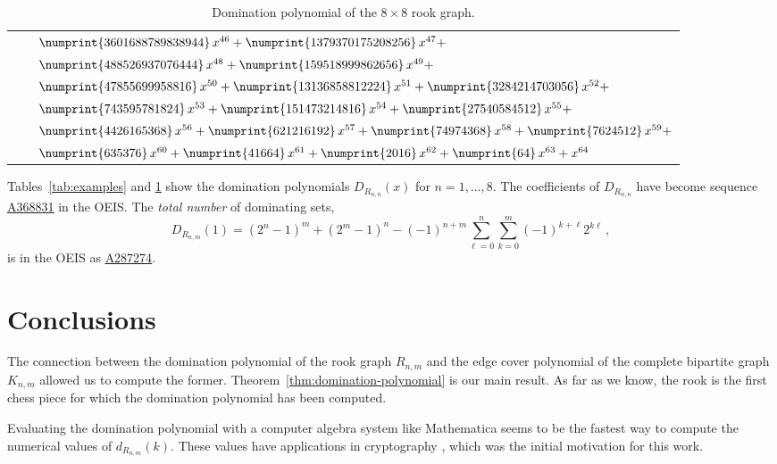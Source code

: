 \documentclass[12pt,reqno]{article}
\newcommand{\seqnum}[1]{\href{https://oeis.org/#1}{\rm \underline{#1}}}
\begin{document}
\begin{table}
\begin{tabular}{rcl}
    & & $\numprint{3601688789838944}\, x^{46} +
        \numprint{1379370175208256}\, x^{47} +$\\
    && $\numprint{488526937076444}\, x^{48} + \numprint{159518999862656}\, x^{49} + $\\
    & & $\numprint{47855699958816}\, x^{50} + \numprint{13136858812224}\, x^{51} + \numprint{3284214703056}\, x^{52} + $\\
    & & $\numprint{743595781824}\, x^{53} + \numprint{151473214816}\, x^{54} + \numprint{27540584512}\, x^{55} + $\\
    & & $\numprint{4426165368}\, x^{56} + \numprint{621216192}\, x^{57} + \numprint{74974368}\, x^{58} + \numprint{7624512}\, x^{59} + $\\
    & & $ \numprint{635376}\, x^{60} + \numprint{41664}\, x^{61} +\numprint{2016}\, x^{62} + \numprint{64}\, x^{63} + x^{64}$
  \end{tabular}
  \caption{Domination polynomial of the $8 \times 8$ rook graph.}
  \label{tab:8x8}
\end{table}

Tables~\ref{tab:examples} and \ref{tab:8x8} show the domination polynomials
  $D_{R_{n,n}}(x)$ for $n=1,\ldots,8$. The coefficients of
  $D_{R_{n,n}}$ have become sequence \seqnum{A368831} in 
  the OEIS. The \emph{total number} of dominating sets,
\begin{equation}
  \label{eq:total}
  D_{R_{n,m}}(1) = (2^n-1)^m + (2^m-1)^n
  -(-1)^{n+m}\sum_{\ell=0}^n\sum_{k=0}^m (-1)^{k+\ell}2^{k\ell}\,,
\end{equation}
is in the OEIS as \seqnum{A287274}.


\section{Conclusions}

The connection between the domination polynomial of the rook graph
$R_{n,m}$ and the edge cover polynomial of the complete bipartite
graph $K_{n,m}$ allowed us to compute the former.
Theorem~\ref{thm:domination-polynomial} is our main result. As far as
we know, the rook is the first chess piece for which the domination
polynomial has been computed.

Evaluating the domination polynomial with a computer algebra system
like Mathematica seems to be the fastest way to compute the numerical
values of $d_{R_{n,m}}(k)$. These values have applications in
cryptography \cite{beguinot:etal:24}, which was the initial motivation
for this work.
\end{document}
